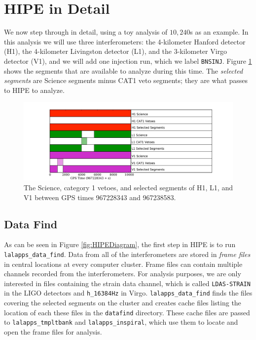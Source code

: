 \section{HIPE in Detail}
\label{sec:HIPEdetail}

We now step through \ihope in detail, using a toy analysis of $10,240$s as an example. In this analysis we will use three interferometers: the 4-kilometer Hanford detector (H1), the 4-kilometer Livingston detector (L1), and the 3-kilometer Virgo detector (V1), and we will add one injection run, which we label \texttt{BNSINJ}. Figure \ref{fig:science-selected_segs} shows the segments that are available to analyze during this time. The \emph{selected segments} are Science segments minus CAT1 veto segments; they are what \ihope passes to \ac{HIPE} to analyze.

\begin{figure}[p]
\begin{center}
\includegraphics[width=5in]{figures/segment_plot_science-selected.pdf}
\end{center}
\caption{
The Science, category 1 vetoes, and selected segments of H1, L1, and V1 between GPS times 967228343 and 967238583.
}
\label{fig:science-selected_segs}
\end{figure}


\subsection{Data Find}

As can be seen in Figure \ref{fig:HIPEDiagram}, the first step in \ac{HIPE} is to run \texttt{lalapps\_data\_find}. Data from all of the interferometers are stored in \emph{frame files} in central locations at every computer cluster. Frame files can contain multiple channels recorded from the interferometers. For analysis purposes, we are only interested in files containing the strain data channel, which is called \texttt{LDAS-STRAIN} in the \ac{LIGO} detectors and \texttt{h\_16384Hz} in Virgo. \texttt{lalapps\_data\_find} finds the files covering the selected segments on the cluster and creates cache files listing the location of each these files in the \texttt{datafind} directory. These cache files are passed to \texttt{lalapps\_tmpltbank} and \texttt{lalapps\_inspiral}, which use them to locate and open the frame files for analysis.

